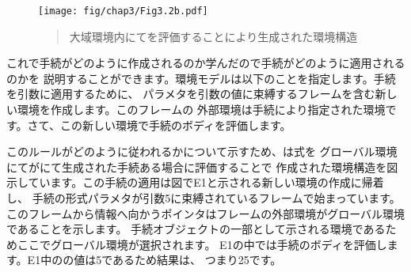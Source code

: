 \begin{figure}[tb]
\label{Figure 3.2}
\centering
\begin{comment}
\heading{Figure 3.2:} Environment structure produced by
evaluating \code{(define (square x) (* x x))} in the global environment.

\begin{example}
           +----------------------+
           | other variables      |
global --->|                      |
env        | square: --+          |
           +-----------|----------+
                       |       ^
(define (square x)     |       |
  (* x x))             V       |
                   .---.---.   |
                   | O | O-+---+
                   `-|-^---'
                     |
                     V
                   parameters: x
                   body: (* x x)
\end{example}
\end{comment}
\texttt{[image: fig/chap3/Fig3.2b.pdf]}
\begin{quote}
 大域環境内にてを評価することにより生成された環境構造
\end{quote}
\end{figure}

\noindent
これで手続がどのように作成されるのか学んだので手続がどのように適用されるのかを
説明することができます。環境モデルは以下のことを指定します。手続を引数に適用するために、
パラメタを引数の値に束縛するフレームを含む新しい環境を作成します。このフレームの
外部環境は手続により指定された環境です。さて、この新しい環境で手続のボディを評価します。



このルールがどのように従われるかについて示すため、は式を
グローバル環境にてがにて生成された手続ある場合に評価することで
作成された環境構造を図示しています。この手続の適用は図でE1と示される新しい環境の作成に帰着し、
手続の形式パラメタが引数5に束縛されているフレームで始まっています。
このフレームから情報へ向かうポインタはフレームの外部環境がグローバル環境であることを示します。
手続オブジェクトの一部として示される環境であるためここでグローバル環境が選択されます。
E1の中では手続のボディを評価します。E1中のの値は5であるため結果は、
つまり25です。

